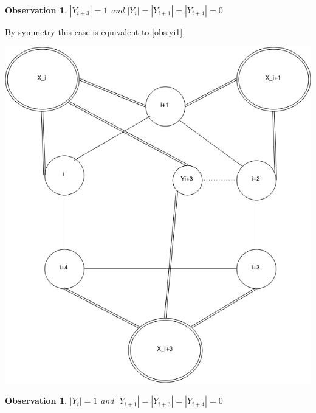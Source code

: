 \documentclass[12pt]{article}
\newtheorem{Observation}[Theorem]{Observation}
\begin{document}
\begin{Observation}\label{obs:yi3}
$|Y_{i+3}| = 1$ and $|Y_i| = |Y_{i+1}| = |Y_{i+4}| = 0$
\end{Observation}

\begin{minipage}{0.5\textwidth}%
	 By symmetry this case is equivalent to \ref{obs:yi1}.
\end{minipage}
\hfill
\begin{minipage}{0.5\textwidth}\raggedleft
	\includegraphics[width=\linewidth]{Yi3.png}
\end{minipage}
\clearpage



\begin{Observation}\label{obs:yi}
$|Y_{i}| = 1$ and $|Y_{i+1}| = |Y_{i+3}| = |Y_{i+4}| = 0$
\end{Observation}
\end{document}

